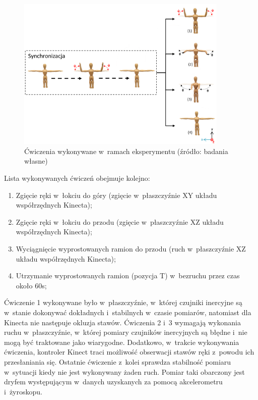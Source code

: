 \begin{figure}[!htb]
	\centering
	\includegraphics[width=0.9\textwidth]{images/poses.png}
	\caption{Ćwiczenia wykonywane w~ramach eksperymentu  (źródło: badania własne)}
	\label{fig:experiments:poses}
\end{figure}
\newpage				
Lista wykonywanych ćwiczeń obejmuje kolejno:

\begin{enumerate}
	\item Zgięcie ręki w~łokciu do góry (zgięcie w~płaszczyźnie XY układu współrzędnych Kinecta); \\
	\item Zgięcie ręki w~łokciu do przodu (zgięcie w~płaszczyźnie XZ układu współrzędnych Kinecta); \\
	\item Wyciągnięcie wyprostowanych ramion do przodu (ruch w~płaszczyźnie XZ układu współrzędnych Kinecta); \\
	\item Utrzymanie wyprostowanych ramion (pozycja T) w~bezruchu przez czas około 60s; \\
\end{enumerate}
						
Ćwiczenie 1 wykonywane było w~płaszczyźnie, w~której czujniki inercyjne są w~stanie dokonywać dokładnych i~stabilnych w~czasie pomiarów, natomiast dla Kinecta nie następuje okluzja stawów. Ćwiczenia 2 i~3 wymagają wykonania ruchu w~płaszczyźnie, w~której pomiary czujników inercyjnych są błędne i~nie mogą być traktowane jako wiarygodne. Dodatkowo, w~trakcie wykonywania ćwiczenia, kontroler Kinect traci możliwość obserwacji stawów ręki z~powodu ich przesłaniania się. Ostatnie ćwiczenie z~kolei sprawdza stabilność pomiaru w~sytuacji kiedy nie jest wykonywany żaden ruch. Pomiar taki obarczony jest dryfem występującym w~danych uzyskanych za pomocą akcelerometru i~żyroskopu.
						

